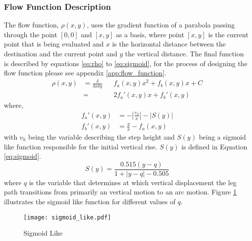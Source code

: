         \subsubsection{Flow Function Description} \label{sec:flow_function}
            The flow function, \(\rho(x,y)\), uses the gradient function of a parabola passing through the point \([0,0]\) and \([x,y]\) as a basis, where point \([x,y]\)
            is the current point that is being evaluated and \(x\) is the horizontal distance between the destination and the current point and \(y\) the
            vertical distance. The final function is described by equations \ref{eq:rho} to \ref{eq:sigmoid}, for the process of designing the flow function
            please see appendix \ref{app:flow_function}.
            \begin{equation} \label{eq:rho}
                \begin{aligned}
                    \rho(x,y) &= \frac{\delta}{\delta x\delta y}&&f_a(x,y)x^2 + f_b(x,y)x + C\\
                    &= &&2f_a'(x,y)x + f_b'(x,y)    
                \end{aligned}
            \end{equation}
            where, %
            \begin{align} \label{eq:fa}
                f_a'(x,y) &= -\left|\frac{v_h}{x}\right| - \left|S(y)\right|\\
                f_b'(x,y) &= \frac{y}{x} - f_a(x,y)
            \end{align}
            with \(v_h\) being the variable describing the step height and \(S(y)\) being a sigmoid like function 
            responsible for the initial vertical rise. \(S(y)\) is defined in Equation \ref{eq:sigmoid}.
            \begin{equation} \label{eq:sigmoid}
                S(y) = \frac{0.515(y-q)}{1+\left|y-q\right|-0.505}
            \end{equation}
            where \(q\) is the variable that determines at which vertical displacement the leg path transitions from primarily an vertical motion to
            an arc motion. Figure \ref{fig:sigmoid_like} illustrates the sigmoid like function for different values of \(q\).
            \begin{figure}[h]
                \centering
                \hspace{-1.38cm}
                \texttt{[image: sigmoid\_like.pdf]}
                \caption{Sigmoid Like}
                \label{fig:sigmoid_like}
            \end{figure}

